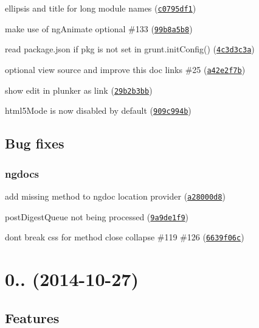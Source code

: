 \begin{DoxyItemize}
\item ellipsis and title for long module names (\href{https://github.com/m7r/grunt-ngdocs/commit/c0795df1}{\tt c0795df1})
\item make use of ng\+Animate optional \#133 (\href{https://github.com/m7r/grunt-ngdocs/commit/99b8a5b8}{\tt 99b8a5b8})
\item read package.\+json if pkg is not set in {\ttfamily grunt.\+init\+Config()} (\href{https://github.com/m7r/grunt-ngdocs/commit/4c3d3c3a}{\tt 4c3d3c3a})
\item optional view source and improve this doc links \#25 (\href{https://github.com/m7r/grunt-ngdocs/commit/a42e2f7b}{\tt a42e2f7b})
\item show edit in plunker as link (\href{https://github.com/m7r/grunt-ngdocs/commit/29b2b3bb}{\tt 29b2b3bb})
\item html5\+Mode is now disabled by default (\href{https://github.com/m7r/grunt-ngdocs/commit/909c994b}{\tt 909c994b})
\end{DoxyItemize}

\subsection*{Bug fixes}

\subsubsection*{ngdocs}


\begin{DoxyItemize}
\item add missing method to ngdoc location provider (\href{https://github.com/m7r/grunt-ngdocs/commit/a28000d8}{\tt a28000d8})
\item post\+Digest\+Queue not being processed (\href{https://github.com/m7r/grunt-ngdocs/commit/9a9de1f9}{\tt 9a9de1f9})
\item don\textquotesingle{}t break css for method close collapse \#119 \#126 (\href{https://github.com/m7r/grunt-ngdocs/commit/6639f06c}{\tt 6639f06c})
\end{DoxyItemize}

\section*{0.. (2014-\/10-\/27)}

\subsection*{Features}

